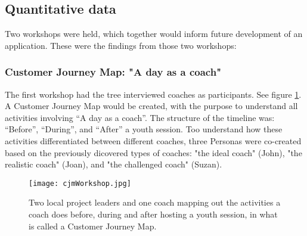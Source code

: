 \subsection{Quantitative data}


    Two workshops were held, which together would inform future development of an application. These were the findings from those two workshops:

    \subsubsection{Customer Journey Map: "A day as a coach"}

    The first workshop had the tree interviewed coaches as participants. See figure \ref{fig:cjm}. A Customer Journey Map would be created, with the purpose to understand all activities involving “A day as a coach”. The structure of the timeline was: “Before”, “During”, and “After” a youth session. Too understand how these activities differentiated between different coaches, three Personas were co-created based on the previously dicovered types of coaches: "the ideal coach" (John), "the realistic coach" (Joan), and "the challenged coach" (Suzan).

    \begin{figure}[h]
        \centering
        \texttt{[image: cjmWorkshop.jpg]}
        \caption{Two local project leaders and one coach mapping out the activities a coach does before, during and after hosting a youth session, in what is called a Customer Journey Map.}
        \label{fig:cjm}
    \end{figure}




